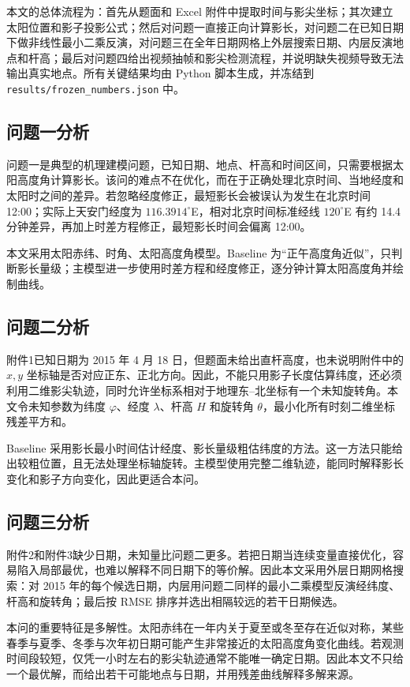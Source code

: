 \documentclass[UTF8,a4paper,12pt]{ctexart}
\begin{document}
本文的总体流程为：首先从题面和 Excel 附件中提取时间与影尖坐标；其次建立太阳位置和影子投影公式；然后对问题一直接正向计算影长，对问题二在已知日期下做非线性最小二乘反演，对问题三在全年日期网格上外层搜索日期、内层反演地点和杆高；最后对问题四给出视频抽帧和影尖检测流程，并说明缺失视频导致无法输出真实地点。所有关键结果均由 Python 脚本生成，并冻结到 \verb|results/frozen_numbers.json| 中。

\subsection{问题一分析}
问题一是典型的机理建模问题，已知日期、地点、杆高和时间区间，只需要根据太阳高度角计算影长。该问的难点不在优化，而在于正确处理北京时间、当地经度和太阳时之间的差异。若忽略经度修正，最短影长会被误认为发生在北京时间 12:00；实际上天安门经度为 $116.3914^\circ$E，相对北京时间标准经线 $120^\circ$E 有约 14.4 分钟差异，再加上时差方程修正，最短影长时间会偏离 12:00。

本文采用太阳赤纬、时角、太阳高度角模型。Baseline 为“正午高度角近似”，只判断影长量级；主模型进一步使用时差方程和经度修正，逐分钟计算太阳高度角并绘制曲线。

\subsection{问题二分析}
附件1已知日期为 2015 年 4 月 18 日，但题面未给出直杆高度，也未说明附件中的 $x,y$ 坐标轴是否对应正东、正北方向。因此，不能只用影子长度估算纬度，还必须利用二维影尖轨迹，同时允许坐标系相对于地理东--北坐标有一个未知旋转角。本文令未知参数为纬度 $\varphi$、经度 $\lambda$、杆高 $H$ 和旋转角 $\theta$，最小化所有时刻二维坐标残差平方和。

Baseline 采用影长最小时间估计经度、影长量级粗估纬度的方法。这一方法只能给出较粗位置，且无法处理坐标轴旋转。主模型使用完整二维轨迹，能同时解释影长变化和影子方向变化，因此更适合本问。

\subsection{问题三分析}
附件2和附件3缺少日期，未知量比问题二更多。若把日期当连续变量直接优化，容易陷入局部最优，也难以解释不同日期下的等价解。因此本文采用外层日期网格搜索：对 2015 年的每个候选日期，内层用问题二同样的最小二乘模型反演经纬度、杆高和旋转角；最后按 RMSE 排序并选出相隔较远的若干日期候选。

本问的重要特征是多解性。太阳赤纬在一年内关于夏至或冬至存在近似对称，某些春季与夏季、冬季与次年初日期可能产生非常接近的太阳高度角变化曲线。若观测时间段较短，仅凭一小时左右的影尖轨迹通常不能唯一确定日期。因此本文不只给一个最优解，而给出若干可能地点与日期，并用残差曲线解释多解来源。
\end{document}

